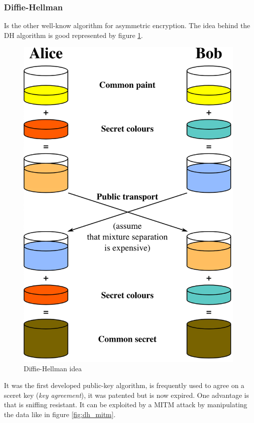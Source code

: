 \documentclass[12pt]{article}
\begin{document}
\subsubsection{Diffie-Hellman}
Is the other well-know algorithm for asymmetric encryption. The idea behind the DH algorithm is good represented by figure \ref{fig:dh}.
\begin{figure}[H]
   \centering
   \includegraphics[width=\linewidth]{images/dh.png}
   \caption{Diffie-Hellman idea}
   \label{fig:dh}
\end{figure}
It was the first developed public-key algorithm, is frequently used to agree on a sceret key (\textit{key agreement}), it was patented but is now expired. One advantage is that is sniffing resistant. It can be exploited by a MITM attack by manipulating the data like in figure \ref{fig:dh_mitm}.
\end{document}

